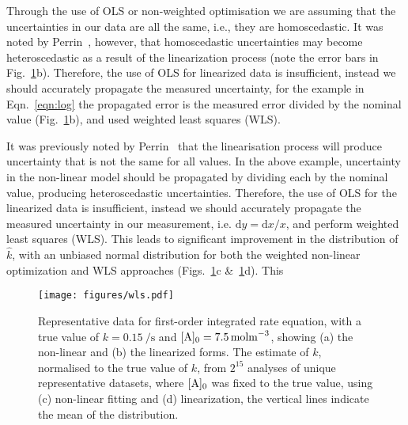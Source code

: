 \documentclass[journal=jceda8,manuscript=article]{achemso}
\begin{document}
Through the use of OLS or non-weighted optimisation we are assuming that the uncertainties in our data are all the same, i.e., they are homoscedastic. 
It was noted by Perrin~\cite{perrin_linear_2017}, however, that homoscedastic uncertainties may become heteroscedastic as a result of the linearization process (note the error bars in Fig.~\ref{fig:wls}b). 
Therefore, the use of OLS for linearized data is insufficient, instead we should accurately propagate the measured uncertainty, for the example in Eqn.~\ref{eqn:log} the propagated error is the measured error divided by the nominal value (Fig.~\ref{fig:wls}b), and used weighted least squares (WLS).

It was previously noted by Perrin~\cite{perrin_linear_2017} that the linearisation process will produce uncertainty that is not the same for all values. 
In the above example, uncertainty in the non-linear model should be propagated by dividing each by the nominal value, producing heteroscedastic uncertainties. 
Therefore, the use of OLS for the linearized data is insufficient, instead we should accurately propagate the measured uncertainty in our measurement, i.e. $\mathrm{d}y = \mathrm{d}x / x$, and perform weighted least squares (WLS). 
This leads to significant improvement in the distribution of $\hat{k}$, with an unbiased normal distribution for both the weighted non-linear optimization and WLS approaches (Figs.~\ref{fig:wls}c \&~\ref{fig:wls}d).
This 


%
\begin{figure}
  \texttt{[image: figures/wls.pdf]}
  \caption{
    Representative data for first-order integrated rate equation, with a true value of $k=\SI{0.15}{\per\second}$ and $[\ce{A}]_0=\SI{7.5}{\mol\m^{-3}}$, showing (a) the non-linear and (b) the linearized forms. 
    The estimate of $k$, normalised to the true value of $k$, from $2^{15}$ analyses of unique representative datasets, where $[\ce{A}]_0$ was fixed to the true value, using (c) non-linear fitting and (d) linearization, the vertical lines indicate the mean of the distribution. 
    }
  \label{fig:wls}
\end{figure}
%
\end{document}
